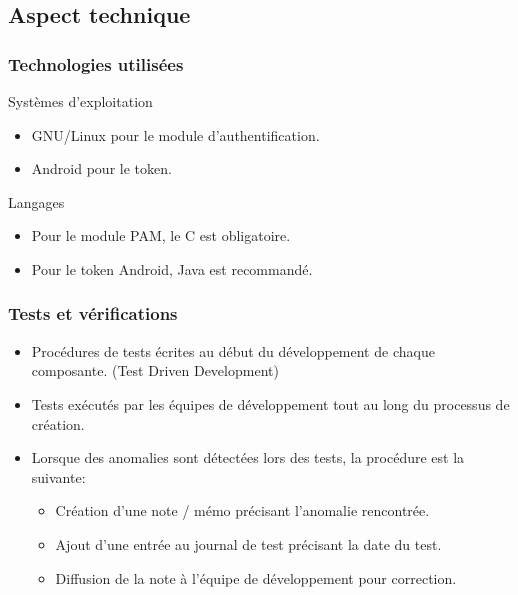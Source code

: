 \documentclass[xcolor=table]{beamer}
\begin{document}
\subsection{Aspect technique}

\begin{frame}
\frametitle{Technologies utilisées}
\begin{block}{Systèmes d'exploitation}
\begin{itemize}
\item GNU/Linux pour le module d'authentification.
\item Android pour le token.
\end{itemize}

\end{block}
\begin{block}{Langages}
\begin{itemize}
  \item Pour le module PAM, le C est obligatoire.
  \item Pour le token Android, Java est recommandé. 
\end{itemize}
\end{block}
\end{frame}


\begin{frame}
  \frametitle{Tests et vérifications}
  \begin{itemize}
   \item Procédures de tests écrites au début du développement de chaque composante. (Test Driven Development)
   \item Tests exécutés par les équipes de développement tout au long du processus de création.
   \item  Lorsque des anomalies sont détectées lors des tests, la procédure est la suivante:
    \begin{itemize}
     \item Création d'une note / mémo précisant l'anomalie rencontrée.
     \item Ajout d'une entrée au journal de test précisant la date du test.
     \item Diffusion de la note à l'équipe de développement pour correction.
    \end{itemize}
  \end{itemize}
\end{frame}
\end{document}
